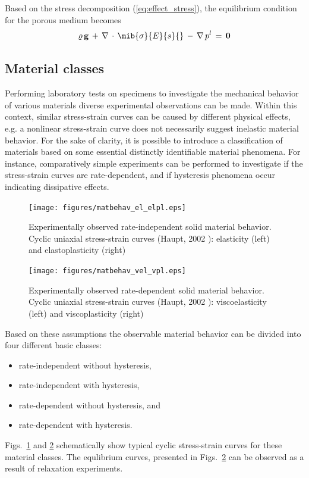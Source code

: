 Based on the stress decomposition (\ref{eq:effect_stress}), the equilibrium condition for the porous medium becomes
\begin{equation}
\varrho\,\mathbf{g}\,+\,\nabla\,\cdot\,\mib{\sigma}{E}{s}{}\,-\,\nabla\,p^{l}\,=\,\mathbf{0}
\label{eq:equi_mod}
\end{equation}

\subsection{Material classes}
\label{sec:matclass}

Performing laboratory tests on specimens to investigate the mechanical behavior of various materials diverse experimental observations can be made. Within this context, similar stress-strain curves can be caused by different physical effects, e.g. a nonlinear stress-strain curve does not necessarily suggest inelastic material behavior. For the sake of clarity, it is possible to introduce a classification of materials based on some essential distinctly identifiable material phenomena. For instance, comparatively simple experiments can be performed to investigate if the stress-strain curves are rate-dependent, and if hysteresis phenomena occur indicating dissipative effects.

\begin{figure}[htb!]
\begin{center}
\footnotesize
\texttt{[image: figures/matbehav\_el\_elpl.eps]}
\caption{Experimentally observed rate-independent solid material behavior. Cyclic uniaxial stress-strain curves (Haupt, 2002 \cite{Haupt:2002}): elasticity (left) and elastoplasticity (right)}
\label{fig:matbehav_el_elpl}
\end{center}
\end{figure}
\begin{figure}[htb!]
\begin{center}
\footnotesize
\texttt{[image: figures/matbehav\_vel\_vpl.eps]}
\caption{Experimentally observed rate-dependent solid material behavior. Cyclic uniaxial stress-strain curves (Haupt, 2002 \cite{Haupt:2002}): viscoelasticity (left) and viscoplasticity (right)}
\label{fig:matbehav_vel_vpl}
\end{center}
\end{figure}

Based on these assumptions the observable material behavior can be divided into four different basic classes:
\begin{itemize}
\item rate-independent without hysteresis,
\item rate-independent with hysteresis,
\item rate-dependent without hysteresis, and
\item rate-dependent with hysteresis.
\end{itemize}
Figs.~\ref{fig:matbehav_el_elpl} and \ref{fig:matbehav_vel_vpl} schematically show typical cyclic stress-strain curves for these material classes. The equlibrium curves, presented in Figs.~\ref{fig:matbehav_vel_vpl} can be observed as a result of relaxation experiments.

